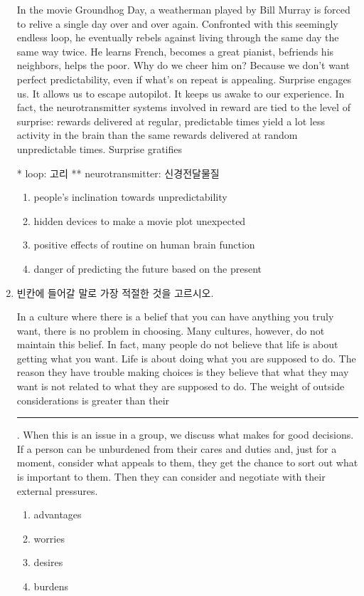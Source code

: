 \documentclass[a4paper, twocolumn]{oblivoir}
\begin{document}
\begin{enumerate}
        In the movie Groundhog Day, a weatherman played by Bill
        Murray is forced to re­live a single day over and over again.
        Confronted with this seemingly endless loop, he eventually
        rebels against living through the same day the same way
        twice. He learns French, becomes a great pianist, befriends
        his neighbors, helps the poor. Why do we cheer him on?
        Because we don’t want perfect predictability, even if what’s on repeat is appealing. Surprise engages us. It allows us to
        escape autopilot. It keeps us awake to our experience. In
        fact, the neurotransmitter systems involved in reward are tied to the level of surprise: rewards delivered at regular,
        predictable times yield a lot less activity in the brain than
        the same rewards delivered at random unpredictable times.
        Surprise gratifies
        \begin{flushright}
            \small{* loop: 고리 ** neurotransmitter: 신경전달물질}
        \end{flushright}
        \begin{enumerate}
            \item people’s inclination towards unpredictability
            \item hidden devices to make a movie plot unexpected
            \item positive effects of routine on human brain function
            \item danger of predicting the future based on the present
        \end{enumerate}
    
        \pagebreak

        \item 빈칸에 들어갈 말로 가장 적절한 것을 고르시오. 
        
        In a culture where there is a belief that you can have
        anything you truly want, there is no problem in choosing.
        Many cultures, however, do not maintain this belief. In fact,
        many people do not believe that life is about getting what
        you want. Life is about doing what you are supposed to do.
        The reason they have trouble making choices is they believe
        that what they may want is not related to what they are
        supposed to do. The weight of outside considerations is
        greater than their \rule{1cm}{0.15mm}. When this is an issue in a
        group, we discuss what makes for good decisions. If a
        person can be unburdened from their cares and duties and,
        just for a moment, consider what appeals to them, they get
        the chance to sort out what is important to them. Then they
        can consider and negotiate with their external pressures.
        \begin{enumerate}
            \item advantages
            \item worries
            \item desires
            \item burdens
        \end{enumerate} 


\end{enumerate}
\end{document}
